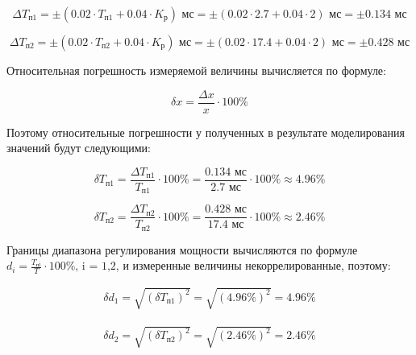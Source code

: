 \begin{displaymath}
	\Delta T_{\text{п1}} = \pm \left( 0.02 \cdot T_{\text{п1}} + 0.04 \cdot K_{\text{р}} \right) \text{ мс} = \pm \left( 0.02 \cdot 2.7 + 0.04 \cdot 2 \right) \text{ мс} = \pm 0.134 \text{ мс} 
\end{displaymath}

\begin{displaymath}
	\Delta T_{\text{п2}} = \pm \left( 0.02 \cdot T_{\text{п2}} + 0.04 \cdot K_{\text{р}} \right) \text{ мс} = \pm \left( 0.02 \cdot 17.4 + 0.04 \cdot 2 \right) \text{ мс} = \pm 0.428 \text{ мс} 
\end{displaymath}

Относительная погрешность измеряемой величины вычисляется по формуле:

\begin{equation}
	\delta x = \frac{\Delta x}{x} \cdot 100\%
\end{equation}

Поэтому относительные погрешности у полученных в результате моделирования значений будут следующими:

\begin{displaymath}
	\delta T_{\text{п1}} = \frac{\Delta T_{\text{п1}}}{T_{\text{п1}}} \cdot 100\% = \frac{0.134 \text{ мс}}{2.7 \text{ мс}} \cdot 100\% \approx 4.96 \%
\end{displaymath}

\begin{displaymath}
	\delta T_{\text{п2}} = \frac{\Delta T_{\text{п2}}}{T_{\text{п2}}} \cdot 100\% = \frac{0.428 \text{ мс}}{17.4 \text{ мс}} \cdot 100\% \approx 2.46 \%
\end{displaymath}

Границы диапазона регулирования мощности вычисляются по формуле\\\noindent $d_i = \frac{T_\text{пi}}{T} \cdot 100\% \text{, i = 1,2}$, и измеренные величины некоррелированные, поэтому:

\begin{displaymath}
\begin{aligned}
	\delta d_1 = \sqrt{(\delta T_{\text{п1}})^2} = \sqrt{(4.96\%)^2} = 4.96 \%
\end{aligned}
\end{displaymath}

\begin{displaymath}
\begin{aligned}
	\delta d_2 = \sqrt{(\delta T_{\text{п2}})^2} = \sqrt{(2.46\%)^2} = 2.46 \%
\end{aligned}
\end{displaymath}

